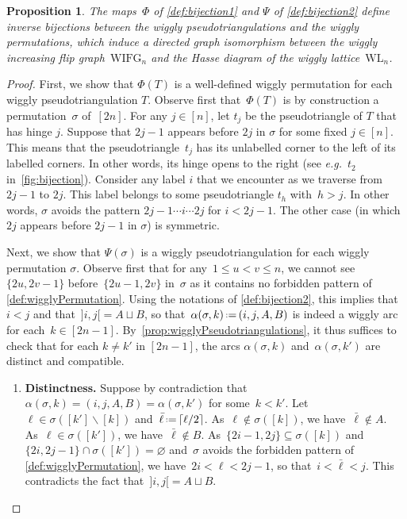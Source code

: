 \documentclass{amsart}
\newtheorem{proposition}[theorem]{Proposition}
\theoremstyle{definition}
\newcommand{\ssm}{\smallsetminus} %
\newcommand{\eqdef}{\mbox{\,\raisebox{0.2ex}{\scriptsize\ensuremath{\mathrm:}}\ensuremath{=}\,}} %
\newcommand{\eg}{\textit{e.g.}~} %
\newcommand{\wigglyIncreasingFlipGraph}{\mathrm{WIFG}} %
\newcommand{\wigglyLattice}{\mathrm{WL}} %
\begin{document}
\begin{proposition}
The maps~$\Phi$ of \cref{def:bijection1} and $\Psi$ of \cref{def:bijection2} define inverse bijections between the wiggly pseudotriangulations and the wiggly permutations, which induce a directed graph isomorphism between the wiggly increasing flip graph~$\wigglyIncreasingFlipGraph_n$ and the Hasse diagram of the wiggly lattice~$\wigglyLattice_n$.
\end{proposition}

\begin{proof}
First, we show that \(\Phi(T)\) is a well-defined wiggly permutation for each wiggly pseudotriangulation \(T\).
Observe first that~\(\Phi(T)\) is by construction a permutation~$\sigma$ of~$[2n]$.
For any \(j \in [n]\), let \(t_j\) be the pseudotriangle of \(T\) that has hinge \(j\).
Suppose that \(2j-1\) appears before \(2j\) in \(\sigma\) for some fixed \(j \in [n]\).
This means that the pseudotriangle~\(t_j\) has its unlabelled corner to the left of its labelled corners.
In other words, its hinge opens to the right (see \eg $t_2$ in~\cref{fig:bijection}).
Consider any label \(i\) that we encounter as we traverse from \(2j-1\) to \(2j\).
This label belongs to some pseudotriangle \(t_h\) with~$h > j$.
In other words, \(\sigma\) avoids the pattern \(2j-1 \cdots i \cdots 2j\) for \(i < 2j-1\).
The other case (in which \(2j\) appears before \(2j-1\) in \(\sigma\)) is symmetric.

Next, we show that \(\Psi(\sigma)\) is a wiggly pseudotriangulation for each wiggly permutation \(\sigma\).
Observe first that for any~$1 \le u < v \le n$, we cannot see~$\{2u, 2v-1\}$ before~$\{2u-1, 2v\}$ in~$\sigma$ as it contains no forbidden pattern of \cref{def:wigglyPermutation}.
Using the notations of \cref{def:bijection2}, this implies that~$i < j$ and that~${]i,j[} = A \sqcup B$, so that~$\alpha(\sigma,k) \eqdef (i, j, A, B)$ is indeed a wiggly arc for each~$k \in [2n-1]$.
By~\cref{prop:wigglyPseudotriangulations}, it thus suffices to check that for each \(k \neq k'\) in \([2n-1]\), the arcs 
\(\alpha(\sigma,k)\) and~\(\alpha(\sigma,k')\) are distinct and compatible.
\begin{enumerate}
\item \textbf{Distinctness.}
Suppose by contradiction that \(\alpha(\sigma,k) = (i,j,A,B) = \alpha(\sigma,k')\) for some~\({k < k'}\).
Let~${\ell \in \sigma([k'] \ssm [k])}$ and~$\bar\ell \eqdef \lceil \ell/2 \rceil$.
As~$\ell \notin \sigma([k])$, we have~$\bar\ell \notin A$.
As~$\ell \in \sigma([k'])$, we have~$\bar\ell \notin B$.
As~$\{2i-1, 2j\} \subseteq \sigma([k])$ and~$\{2i, 2j-1\} \cap \sigma([k']) = \varnothing$ and~$\sigma$ avoids the forbidden pattern of \cref{def:wigglyPermutation}, we have~$2i < \ell < 2j-1$, so that~$i < \bar\ell < j$.
This contradicts the fact that~${]i,j[} = A \sqcup B$.


\end{enumerate}
\end{proof}
\end{document}
